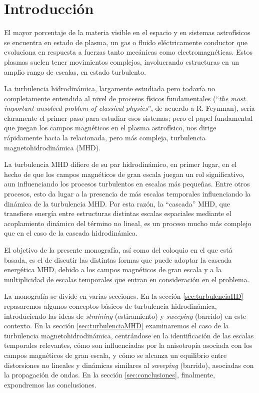 \section{Introducción}

El mayor porcentaje de la materia visible en el espacio y en sistemas
astrofísicos se encuentra en estado de plasma, un gas o fluido
eléctricamente conductor que evoluciona en respuesta a fuerzas tanto
mecánicas como electromagnéticas. Estos plasmas suelen tener
movimientos complejos, involucrando estructuras en un amplio rango de
escalas, en estado turbulento.

La turbulencia hidrodinámica, largamente estudiada pero todavía no
completamente entendida al nivel de procesos físicos fundamentales
(``\textit{the most important unsolved problem of classical physics}'', de
acuerdo a R. Feynman), sería claramente el primer paso para estudiar
esos sistemas; pero el papel fundamental que juegan los campos
magnéticos en el plasma astrofísico, nos dirige rápidamente hacia la
relacionada, pero más compleja, turbulencia magnetohidrodinámica (MHD).

La turbulencia MHD difiere de su par hidrodinámico, en primer lugar,
en el hecho de que los campos magnéticos de gran escala juegan un rol
significativo, aun influenciando los procesos turbulentos en escalas
más pequeñas. Entre otros procesos, esto da lugar a la presencia de
más escalas temporales influenciando la dinámica de la turbulencia
MHD. Por esta razón, la ``cascada'' MHD, que transfiere energía entre
estructuras distintas escalas espaciales mediante el acoplamiento
dinámico del término no lineal, es un proceso mucho más complejo que
en el caso de la cascada hidrodinámica.

El objetivo de la presente monografía, así como del coloquio en el que
está basada, es el de discutir las distintas formas que puede adoptar
la cascada energética MHD, debido a los campos magnéticos de gran
escala y a la multiplicidad de escalas temporales que entran en
consideración en el problema.

La monografía se divide en varias secciones. En la sección
\ref{sec:turbulenciaHD} repasaremos algunos conceptos básicos de
turbulencia hidrodinámica, introduciendo las ideas de
\textit{straining} (estiramiento) y \textit{sweeping} (barrido) en
este contexto. En la sección \ref{sec:turbulenciaMHD} examinaremos el
caso de la turbulencia magnetohidrodinámica, centrándose en la
identificación de las escalas temporales relevantes, cómo son
influenciadas por la anisotropía asociada con los campos magnéticos de
gran escala, y cómo se alcanza un equilibrio entre distorsiones no
lineales y dinámicas similares al \textit{sweeping} (barrido),
asociadas con la propagación de ondas. En la sección
\ref{sec:conclusiones}, finalmente, expondremos las conclusiones.

